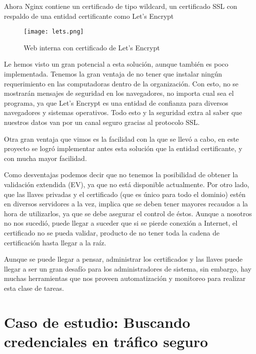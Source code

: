 Ahora Nginx contiene un certificado de tipo wildcard, un certificado SSL con respaldo de una 
entidad certificante como Let's Encrypt

\begin{center}
   \begin{figure}   
      \begin{center}
         \texttt{[image: lets.png]}
      \end{center}
      \caption{Web interna con certificado de Let’s Encrypt}
   \end{figure}
\end{center}

Le hemos visto un gran potencial a esta solución, aunque también es poco implementada. Tenemos la gran ventaja de no
tener que instalar ningún requerimiento en las computadoras dentro de la organización. Con esto, no se 
mostrarán mensajes de seguridad en los navegadores, no importa cual sea el programa, ya que Let's Encrypt es 
una entidad de confianza para diversos navegadores y sistemas operativos. Todo esto y la seguridad extra al 
saber que nuestros datos van por un canal seguro gracias al protocolo SSL. 

Otra gran ventaja que vimos es la facilidad con la que se llevó a cabo, 
en este proyecto se logró implementar antes esta solución que la entidad certificante, y 
con mucha mayor facilidad. 

Como desventajas podemos decir que no tenemos la posibilidad de obtener la validación extendida (EV), ya que no está
disponible actualmente. Por otro lado, que las llaves privadas y el certificado (que es único para todo el dominio) 
estén en diversos servidores a la vez, implica
que se deben tener mayores recaudos a la hora de utilizarlos, ya que se debe asegurar el control de éstos. Aunque a 
nosotros no nos sucedió, puede llegar a suceder que si se pierde conexión a Internet, el certificado no se pueda validar,
producto de no tener toda la cadena de certificación hasta llegar a la raíz. 

Aunque se puede llegar a pensar, administrar los certificados y las llaves puede llegar a ser 
un gran desafío para los administradores de sistema, sin embargo, hay muchas herramientas que nos proveen
automatización y monitoreo para realizar esta clase de tareas. 


\section{Caso de estudio: Buscando credenciales en tráfico seguro}

